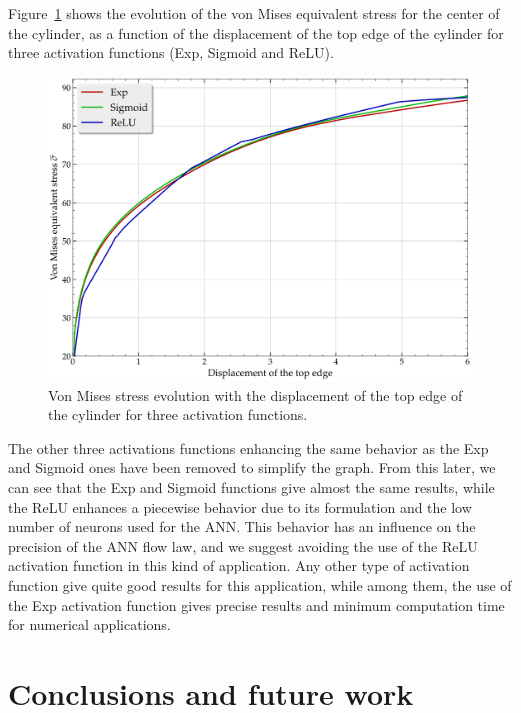 \documentclass[algorithms,article,submit,pdftex,oneauthors]{Definitions/mdpi}
\begin{document}
Figure~\ref{fig:Num-misesTH} shows the evolution of the von Mises equivalent stress for the center of the cylinder, as a function of the displacement of the top edge of the cylinder for three activation functions (Exp, Sigmoid and ReLU).
\begin{figure}[h!]
\centering
\includegraphics[width=0.8\columnwidth]{Figures/vonMises}
\caption{Von Mises stress evolution with the displacement of the top edge of the cylinder for three activation functions.}
\label{fig:Num-misesTH}
\end{figure}
The other three activations functions enhancing the same behavior as the Exp and Sigmoid ones have been removed to simplify the graph.
From this later, we can see that the Exp and Sigmoid functions give almost the same results, while the ReLU enhances a piecewise behavior due to its formulation and the low number of neurons used for the ANN.
This behavior has an influence on the precision of the ANN flow law, and we suggest avoiding the use of the ReLU activation function in this kind of application.
Any other type of activation function give quite good results for this application, while among them, the use of the Exp activation function gives precise results and minimum computation time for numerical applications.

\section{Conclusions and future work}\label{sec:Conclusions}
\end{document}
